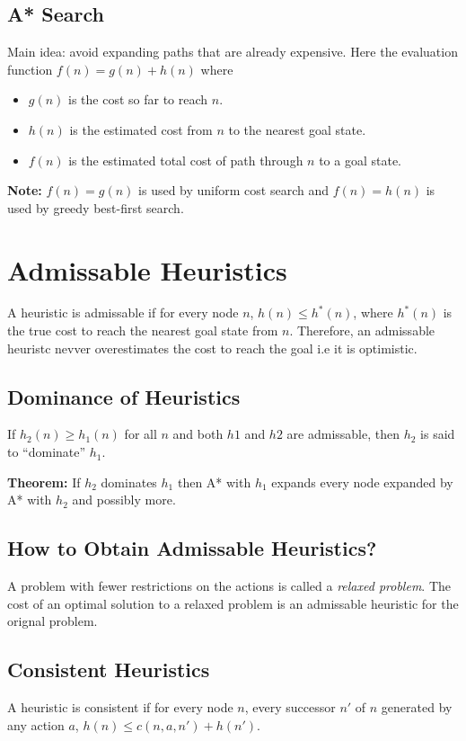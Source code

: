 \documentclass{article}
\begin{document}
\subsection{A* Search}
Main idea:
avoid expanding paths that are already expensive.
Here the evaluation function $f(n) = g(n) + h(n)$ where 
\begin{itemize}
	\item $g(n)$ is the cost so far to reach $n$.
	\item $h(n)$ is the estimated cost from $n$ to the nearest goal state.
	\item $f(n)$ is the estimated total cost of path through $n$ to a goal state.
\end{itemize}

\textbf{Note:} $f(n) = g(n)$ is used by uniform cost search and $f(n) = h(n)$ is used by greedy best-first search.

\section{Admissable Heuristics}
A heuristic is admissable if for every node $n$, $h(n)\le h^*(n)$, where $h^*(n)$ is the true cost to reach the nearest goal state from $n$.
Therefore, an admissable heuristc nevver overestimates the cost to reach the goal i.e it is optimistic.

\subsection{Dominance of Heuristics}
If $h_2(n) \ge h_1(n)$ for all $n$ and both $h1$ and $h2$ are admissable, then $h_2$ is said to ``dominate'' $h_1$.

\smallskip
\textbf{Theorem:} If $h_2$ dominates $h_1$ then A* with $h_1$ expands every node expanded by A* with $h_2$ and possibly more.

\subsection{How to Obtain Admissable Heuristics?}
A problem with fewer restrictions on the actions is called a \textit{relaxed problem}.
The cost of an optimal solution to a relaxed problem is an admissable heuristic for the orignal problem.

\subsection{Consistent Heuristics}
A heuristic is consistent if for every node $n$, every successor $n'$ of $n$ generated by any action $a$, $h(n) \le c(n,a,n') + h(n')$.
\end{document}
